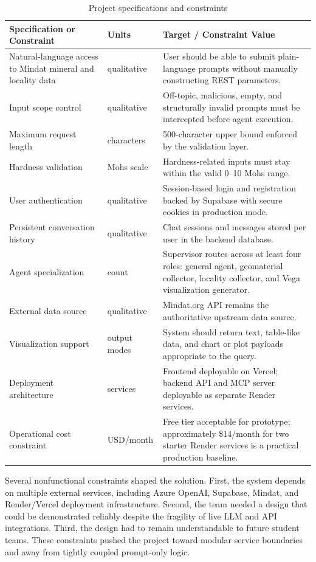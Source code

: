 \documentclass[12pt,oneside]{report}
\begin{document}
\begin{table}[H]
\centering
\caption{Project specifications and constraints}
\label{tab:requirements}
\begin{tabularx}{\textwidth}{>{\raggedright\arraybackslash}p{2.4in} >{\raggedright\arraybackslash}p{1.1in} X}
\toprule
\textbf{Specification or Constraint} & \textbf{Units} & \textbf{Target / Constraint Value} \\
\midrule
Natural-language access to Mindat mineral and locality data & qualitative & User should be able to submit plain-language prompts without manually constructing REST parameters. \\
Input scope control & qualitative & Off-topic, malicious, empty, and structurally invalid prompts must be intercepted before agent execution. \\
Maximum request length & characters & 500-character upper bound enforced by the validation layer. \\
Hardness validation & Mohs scale & Hardness-related inputs must stay within the valid 0--10 Mohs range. \\
User authentication & qualitative & Session-based login and registration backed by Supabase with secure cookies in production mode. \\
Persistent conversation history & qualitative & Chat sessions and messages stored per user in the backend database. \\
Agent specialization & count & Supervisor routes across at least four roles: general agent, geomaterial collector, locality collector, and Vega visualization generator. \\
External data source & qualitative & Mindat.org API remains the authoritative upstream data source. \\
Visualization support & output modes & System should return text, table-like data, and chart or plot payloads appropriate to the query. \\
Deployment architecture & services & Frontend deployable on Vercel; backend API and MCP server deployable as separate Render services. \\
Operational cost constraint & USD/month & Free tier acceptable for prototype; approximately \$14/month for two starter Render services is a practical production baseline. \\
\bottomrule
\end{tabularx}
\end{table}

Several nonfunctional constraints shaped the solution. First, the system depends on multiple external services, including Azure OpenAI, Supabase, Mindat, and Render/Vercel deployment infrastructure. Second, the team needed a design that could be demonstrated reliably despite the fragility of live LLM and API integrations. Third, the design had to remain understandable to future student teams. These constraints pushed the project toward modular service boundaries and away from tightly coupled prompt-only logic.
\end{document}
